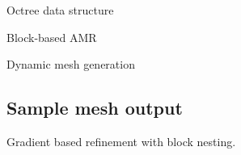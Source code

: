 
\begin{DoxyItemize}
\item Octree data structure
\item Block-\/based A\+M\+R
\item Dynamic mesh generation
\end{DoxyItemize}

\subsection*{Sample mesh output}

 Gradient based refinement with block nesting. 